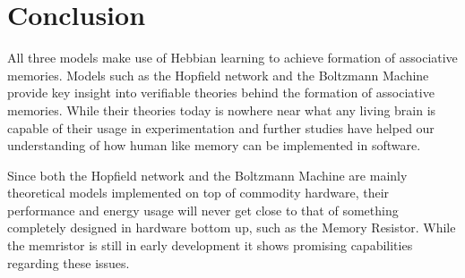 \section{Conclusion}

All three models make use of Hebbian learning to achieve formation of associative memories. Models such as the Hopfield network and the Boltzmann Machine provide key insight into verifiable theories behind the formation of associative memories. While their theories today is nowhere near what any living brain is capable of their usage in experimentation and further studies have helped our understanding of how human like memory can be implemented in software.

Since both the Hopfield network and the Boltzmann Machine are mainly theoretical models implemented on top of commodity hardware, their performance and energy usage will never get close to that of something completely designed in hardware bottom up, such as the Memory Resistor. While the memristor is still in early development it shows promising capabilities regarding these issues.







